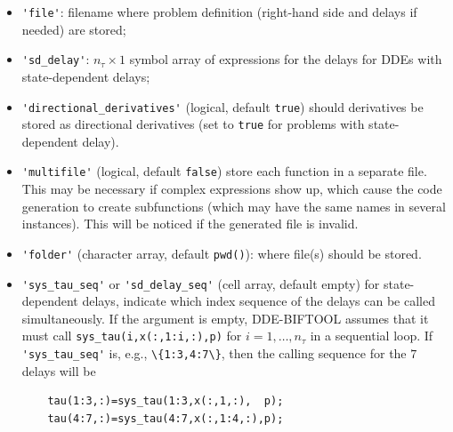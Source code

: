 \documentclass[10pt]{scrartcl}
\newcommand{\DDEBIFCODE}{\textsc{DDE-BIFTOOL}}
\newcommand{\blist}[1]{\mbox{\lstinline!#1!}}
\begin{document}
\begin{itemize}
\item \blist{'file'}: filename where problem definition (right-hand side and delays if needed) are stored;
\item \blist{'sd_delay'}: $n_\tau\times1$ symbol array of expressions for
  the delays for DDEs with state-dependent delays;
\item \blist{'directional_derivatives'} (logical, default
  \blist{true}) should derivatives be stored as directional
  derivatives (set to \blist{true} for problems with state-dependent delay).
\item \blist{'multifile'} (logical, default \blist{false}) store each
  function in a separate file. This may be necessary if complex
  expressions show up, which cause the code generation to create
  subfunctions (which may have the same names in several
  instances). This will be noticed if the generated file is invalid.
\item \blist{'folder'} (character array, default \blist{pwd()}): where file(s) should be stored.
\item \blist{'sys_tau_seq'} or \blist{'sd_delay_seq'} (cell array, default empty) for
  state-dependent delays, indicate which index sequence of the delays
  can be called simultaneously. If the argument is empty, {\DDEBIFCODE} assumes that it must call \blist{sys_tau(i,x(:,1:i,:),p)} for $i=1,\ldots,n_\tau$ in a sequential loop. If \blist{'sys_tau_seq'} is, e.g.,  \blist{\{1:3,4:7\}}, then the calling sequence for the $7$ delays will be
  \begin{lstlisting}
    tau(1:3,:)=sys_tau(1:3,x(:,1,:),  p);
    tau(4:7,:)=sys_tau(4:7,x(:,1:4,:),p);    
  \end{lstlisting}
\end{itemize}
\end{document}
